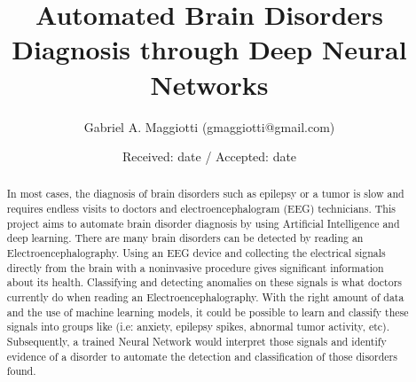 \documentclass{llncs}       %
\begin{document}
\title{Automated Brain Disorders Diagnosis through Deep Neural Networks%
}


\author{Gabriel A. Maggiotti (gmaggiotti@gmail.com)
}



\date{Received: date / Accepted: date}


\maketitle


\begin{abstract}
In most cases, the diagnosis of brain disorders such as epilepsy or a tumor is slow and requires endless visits to doctors and electroencephalogram (EEG) technicians. This project aims to automate brain disorder diagnosis by using Artificial Intelligence and deep learning. There are many brain disorders  can be detected by reading an Electroencephalography. Using an EEG device and collecting the electrical signals directly from the brain with a noninvasive procedure gives significant information about its health. Classifying and detecting anomalies on these signals is what doctors currently do when reading an Electroencephalography. With the right amount of data and the use of machine learning models, it could be possible to learn and classify these signals into groups like (i.e: anxiety, epilepsy spikes, abnormal tumor activity, etc). Subsequently, a trained Neural Network would interpret those signals and identify evidence of a disorder to automate the detection and classification of those disorders found. 
\end{abstract}


\paragraph{}\paragraph{}
\end{document}
